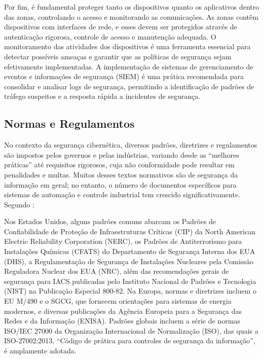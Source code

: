         Por fim, é fundamental proteger tanto os dispositivos quanto os aplicativos dentro das zonas, controlando o acesso e monitorando as comunicações. As zonas contêm dispositivos com interfaces de rede, e esses devem ser protegidos através de autenticação rigorosa, controle de acesso e manutenção adequada. O monitoramento das atividades dos dispositivos é uma ferramenta essencial para detectar possíveis ameaças e garantir que as políticas de segurança sejam efetivamente implementadas. A implementação de sistemas de gerenciamento de eventos e informações de segurança (SIEM) é uma prática recomendada para consolidar e analisar logs de segurança, permitindo a identificação de padrões de tráfego suspeitos e a resposta rápida a incidentes de segurança.

    \subsection{Normas e Regulamentos}

        No contexto da segurança cibernética, diversos padrões, diretrizes e regulamentos são impostos pelos governos e pelas indústrias, variando desde as “melhores práticas” até requisitos rigorosos, cuja não conformidade pode resultar em penalidades e multas. Muitos desses textos normativos são de segurança da informação em geral; no entanto, o número de documentos específicos para sistemas de automação e controle industrial tem crescido significativamente. Segundo :

        \begin{citacao}
            Nos Estados Unidos, alguns padrões comuns abarcam os Padrões de Confiabilidade de Proteção de Infraestruturas Críticas (CIP) da North American Electric Reliability Corporation (NERC), os Padrões de Antiterrorismo para Instalações Químicas (CFATS) do Departamento de Segurança Interna dos EUA (DHS), a Regulamentação de Segurança de Instalações Nucleares pela Comissão Reguladora Nuclear dos EUA (NRC), além das recomendações gerais de segurança para IACS publicadas pelo Instituto Nacional de Padrões e Tecnologia (NIST) na Publicação Especial 800-82. Na Europa, normas e diretrizes incluem o EU M/490 e o SGCG, que fornecem orientações para sistemas de energia modernos, e diversas publicações da Agência Europeia para a Segurança das Redes e da Informação (ENISA). Padrões globais incluem a série de normas ISO/IEC 27000 da Organização Internacional de Normalização (ISO), das quais a ISO-27002:2013, “Código de prática para controles de segurança da informação”, é amplamente adotada.
        \end{citacao}
        
